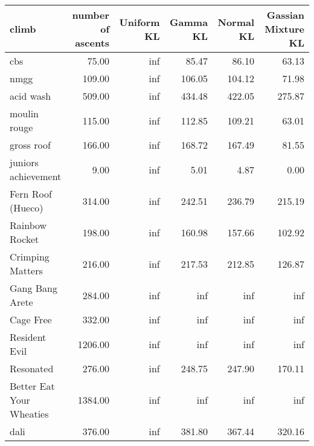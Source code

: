 \begin{tabular}{lrrrrr}
\toprule
                   climb &  number of ascents &  Uniform KL &  Gamma KL &  Normal KL &  Gassian Mixture KL \\
\midrule
                     cbs &              75.00 &         inf &     85.47 &      86.10 &               63.13 \\
                    nmgg &             109.00 &         inf &    106.05 &     104.12 &               71.98 \\
               acid wash &             509.00 &         inf &    434.48 &     422.05 &              275.87 \\
            moulin rouge &             115.00 &         inf &    112.85 &     109.21 &               63.01 \\
              gross roof &             166.00 &         inf &    168.72 &     167.49 &               81.55 \\
     juniors achievement &               9.00 &         inf &      5.01 &       4.87 &                0.00 \\
       Fern Roof (Hueco) &             314.00 &         inf &    242.51 &     236.79 &              215.19 \\
          Rainbow Rocket &             198.00 &         inf &    160.98 &     157.66 &              102.92 \\
        Crimping Matters &             216.00 &         inf &    217.53 &     212.85 &              126.87 \\
        Gang Bang Arete  &             284.00 &         inf &       inf &        inf &                 inf \\
               Cage Free &             332.00 &         inf &       inf &        inf &                 inf \\
           Resident Evil &            1206.00 &         inf &       inf &        inf &                 inf \\
               Resonated &             276.00 &         inf &    248.75 &     247.90 &              170.11 \\
Better Eat Your Wheaties &            1384.00 &         inf &       inf &        inf &                 inf \\
                    dali &             376.00 &         inf &    381.80 &     367.44 &              320.16 \\
\bottomrule
\end{tabular}
